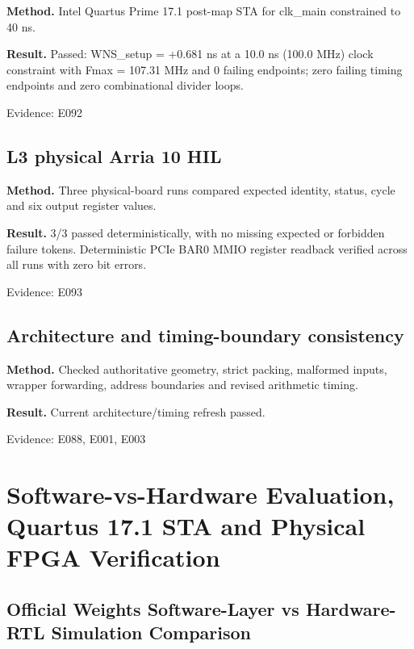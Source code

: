 \documentclass[11pt,a4paper]{article}
\begin{document}
\textbf{Method.} Intel Quartus Prime 17.1 post-map STA for clk\_\allowbreak{}main constrained to 40 ns.

\textbf{Result.} Passed: WNS\_\allowbreak{}setup =\allowbreak{} +\allowbreak{}0.681 ns at a 10.0 ns (\allowbreak{}100.0 MHz)\allowbreak{} clock constraint with Fmax =\allowbreak{} 107.31 MHz and 0 failing endpoints; zero failing timing endpoints and zero combinational divider loops.

{\small Evidence: E092}

\subsection{L3 physical Arria 10 HIL}

\textbf{Method.} Three physical-board runs compared expected identity,\allowbreak{} status,\allowbreak{} cycle and six output register values.

\textbf{Result.} 3/\allowbreak{}3 passed deterministically,\allowbreak{} with no missing expected or forbidden failure tokens. Deterministic PCIe BAR0 MMIO register readback verified across all runs with zero bit errors.

{\small Evidence: E093}

\subsection{Architecture and timing-boundary consistency}

\textbf{Method.} Checked authoritative geometry,\allowbreak{} strict packing,\allowbreak{} malformed inputs,\allowbreak{} wrapper forwarding,\allowbreak{} address boundaries and revised arithmetic timing.

\textbf{Result.} Current architecture/\allowbreak{}timing refresh passed.

{\small Evidence: E088,\allowbreak{} E001,\allowbreak{} E003}

\section{Software-vs-Hardware Evaluation, Quartus 17.1 STA and Physical FPGA Verification}

\subsection{Official Weights Software-Layer vs Hardware-RTL Simulation Comparison}
\end{document}
